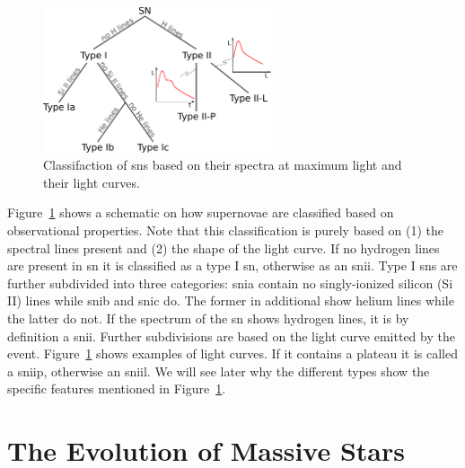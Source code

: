 \begin{figure}[tb]
    \centering
    \includegraphics[width=0.6\textwidth]{graphics/massive_stars/sn_classification}
    \caption{Classifaction of \acp{sn} based on their spectra at maximum light and their light curves.}
    \label{fig:massive_stars:sne_classification}
\end{figure}
Figure~\ref{fig:massive_stars:sne_classification} shows a schematic on how supernovae are classified based on observational properties. Note that this classification is purely based on (1) the spectral lines present and (2) the shape of the light curve. If no hydrogen lines are present in \ac{sn} it is classified as a type I \acl{sn}, otherwise as an \ac{snii}. Type I \acp{sn} are further subdivided into three categories: \ac{snia} contain no singly-ionized silicon (Si II) lines while \ac{snib} and \ac{snic} do. The former in additional show helium lines while the latter do not. If the spectrum of the \ac{sn} shows hydrogen lines, it is by definition a \ac{snii}. Further subdivisions are based on the light curve emitted by the event. Figure~\ref{fig:massive_stars:sne_classification} shows examples of light curves. If it contains a plateau it is called a \ac{sniip}, otherwise an \ac{sniil}. We will see later why the different types show the specific features mentioned in Figure~\ref{fig:massive_stars:sne_classification}.



\section{The Evolution of Massive Stars}

